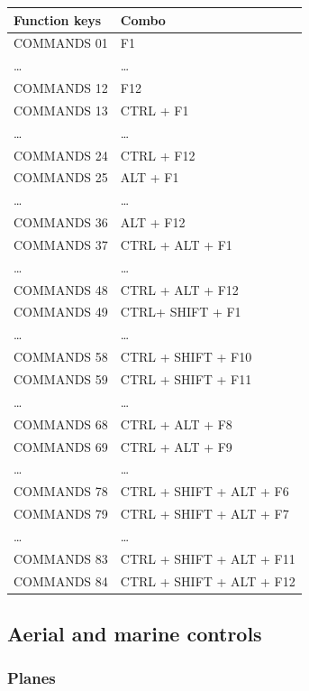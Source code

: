\begin{tabular}{ |l|l| } 
\hline
Function keys & Combo \\
\hline
COMMANDS 01 & F1 \\
\hline
\ldots{} & \ldots{} \\
\hline
COMMANDS 12 & F12 \\
\hline
COMMANDS 13 & CTRL + F1 \\
\hline
\ldots{} & \ldots{} \\
\hline
COMMANDS 24 & CTRL + F12 \\
\hline
COMMANDS 25 & ALT + F1 \\
\hline
\ldots{} & \ldots{} \\
\hline
COMMANDS 36 & ALT + F12 \\
\hline
COMMANDS 37 & CTRL + ALT + F1 \\
\hline
\ldots{} & \ldots{} \\
\hline
COMMANDS 48 & CTRL + ALT + F12 \\
\hline
COMMANDS 49 & CTRL+ SHIFT + F1 \\
\hline
\ldots{} & \ldots{} \\
\hline
COMMANDS 58 & CTRL + SHIFT + F10 \\
\hline
COMMANDS 59 & CTRL + SHIFT + F11 \\
\hline
\ldots{} & \ldots{} \\
\hline
COMMANDS 68 & CTRL + ALT + F8 \\
\hline
COMMANDS 69 & CTRL + ALT + F9 \\
\hline
\ldots{} & \ldots{} \\
\hline
COMMANDS 78 & CTRL + SHIFT + ALT + F6 \\
\hline
COMMANDS 79 & CTRL + SHIFT + ALT + F7 \\
\hline
\ldots{} & \ldots{} \\
\hline
COMMANDS 83 & CTRL + SHIFT + ALT + F11 \\
\hline
COMMANDS 84 & CTRL + SHIFT + ALT + F12 \\
\hline
\end{tabular}

\hypertarget{aerial-and-marine-controls}{%
\subsection{Aerial and marine
controls}\label{aerial-and-marine-controls}}


\hypertarget{planes}{%
\subsubsection{Planes}\label{planes}}

